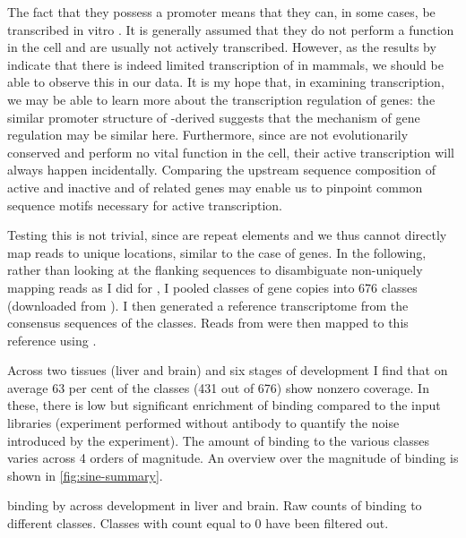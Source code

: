The fact that they possess a  promoter means that they can, in some cases,
be transcribed in vitro \citep{White:1998}. It is generally assumed that they do
not perform a function in the cell and are usually not actively transcribed.
However, as the results by \citet{Carriere:2012} indicate that there is indeed
limited transcription of \transsine in mammals, we should be able to observe
this in our  \chip data. It is my hope that, in examining \transsine
transcription, we may be able to learn more about the transcription regulation
of \trna genes: the similar promoter structure of \trna-derived \transsine[s]
suggests that the mechanism of gene regulation may be similar here. Furthermore,
since \transsine[s] are not evolutionarily conserved and perform no vital
function in the cell, their active transcription will always happen
incidentally. Comparing the upstream sequence composition of active and inactive
\transsine[s] and of related \trna genes may enable us to pinpoint common
sequence motifs necessary for active transcription.

Testing this is not trivial, since \transsine[s] are repeat elements and we thus
cannot directly map reads to unique locations, similar to the case of \trna
genes. In the following, rather than looking at the flanking sequences to
disambiguate non-uniquely mapping reads as I did for \trna, I pooled classes of
\transsine gene copies into \num{676} classes (downloaded from 
\citep{Jurka:2005}). I then generated a reference transcriptome from the
consensus sequences of the \transsine classes. Reads from  \chipseq were
then mapped to this reference using .

Across two tissues (liver and brain) and six stages of development I find that
on average \num{63} per cent of the \transsine classes (\num{431} out of
\num{676}) show nonzero coverage. In these, there is low but significant
enrichment of  binding compared to the input libraries (\chipseq experiment
performed without antibody to quantify the noise introduced by the experiment).
The amount of  binding to the various \transsine classes varies across
\num{4} orders of magnitude. An overview over the magnitude of binding is shown
in \cref{fig:sine-summary}.

    { binding by  across development in liver and
    brain.}
    {Raw counts of  binding to different  classes.
    Classes with count equal to \num{0} have been filtered out.}

